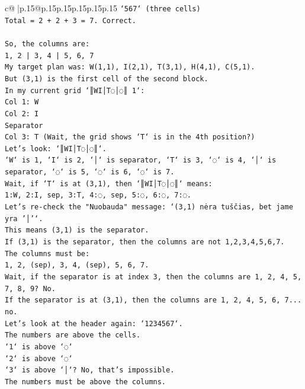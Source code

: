 \documentclass{article}
\begin{document}
{\begin{supertabular}{c@{$\;$}|p{.15\linewidth}@{}p{.15\linewidth}p{.15\linewidth}p{.15\linewidth}p{.15\linewidth}p{.15\linewidth}}
{{{\texttt{`567` (three cells)} \\
\texttt{Total = 2 + 2 + 3 = 7. Correct.} \\
\\ 
\texttt{So, the columns are:} \\
\texttt{1, 2 | 3, 4 | 5, 6, 7} \\
\texttt{My target plan was: W(1,1), I(2,1), T(3,1), H(4,1), C(5,1).} \\
\texttt{But (3,1) is the first cell of the second block.} \\
\texttt{In my current grid `║WI│T◌│◌║ 1`:} \\
\texttt{Col 1: W} \\
\texttt{Col 2: I} \\
\texttt{Separator} \\
\texttt{Col 3: T (Wait, the grid shows `T` is in the 4th position?)} \\
\texttt{Let's look: `║WI│T◌│◌║`.} \\
\texttt{`W` is 1, `I` is 2, `│` is separator, `T` is 3, `◌` is 4, `│` is separator, `◌` is 5, `◌` is 6, `◌` is 7.} \\
\texttt{Wait, if `T` is at (3,1), then `║WI│T◌│◌║` means:} \\
\texttt{1:W, 2:I, sep, 3:T, 4:◌, sep, 5:◌, 6:◌, 7:◌.} \\
\texttt{Let's re{-}check the "Nuobauda" message: `(3,1) nėra tuščias, bet jame yra '│'`.} \\
\texttt{This means (3,1) is the separator.} \\
\texttt{If (3,1) is the separator, then the columns are not 1,2,3,4,5,6,7.} \\
\texttt{The columns must be:} \\
\texttt{1, 2, (sep), 3, 4, (sep), 5, 6, 7.} \\
\texttt{Wait, if the separator is at index 3, then the columns are 1, 2, 4, 5, 7, 8, 9? No.} \\
\texttt{If the separator is at (3,1), then the columns are 1, 2, 4, 5, 6, 7... no.} \\
\texttt{Let's look at the header again: `1234567`.} \\
\texttt{The numbers are above the cells.} \\
\texttt{`1` is above `◌`} \\
\texttt{`2` is above `◌`} \\
\texttt{`3` is above `│`? No, that's impossible.} \\
\texttt{The numbers must be above the columns.} \\
}}}
\end{supertabular}}
\end{document}
